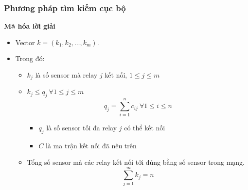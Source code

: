 \begin{frame}
    \frametitle{Phương pháp tìm kiếm cục bộ}

    \textbf{Mã hóa lời giải}
    \begin{itemize}
        \item Vector $k = (k_1, k_2,…, k_m)$.
        \item Trong đó: 
        \begin{itemize}
            \item $k_j$ là số sensor mà relay $j$ kết nối, $1 \leq j \leq m$
            \item $k_j \leq q_j ~\forall 1 \leq j \leq m$ 
            \begin{equation*}
                q_j = \sum_{i = 1}^n c_{ij} ~\forall 1 \leq i \leq n
            \end{equation*}
            \begin{itemize}
                \item[] $q_j$ là số sensor tối đa relay $j$ có thể kết nối
                \item[] $C$ là ma trận kết nối đã nêu trên
            \end{itemize}
            \item Tổng số sensor mà các relay kết nối tới đúng bằng số sensor trong mạng.
            \begin{equation*}
                \sum_{j = 1}^m k_j = n
            \end{equation*}
        \end{itemize}
    \end{itemize}
\end{frame}


